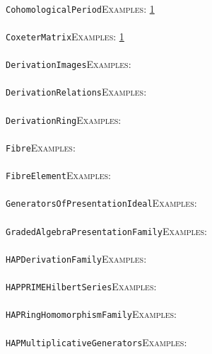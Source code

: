 \documentclass[a4paper,11pt]{report}
\begin{document}
{{ \\
 \texttt{CohomologicalPeriod}{\nobreakspace}{\nobreakspace}{\nobreakspace}{\nobreakspace}\textsc{Examples:} \href{tutorial/chap10.html} {1}{\nobreakspace} \\
 \\
 \texttt{CoxeterMatrix}{\nobreakspace}{\nobreakspace}{\nobreakspace}{\nobreakspace}\textsc{Examples:} \href{../www/SideLinks/About/aboutDavisComplex.html} {1}{\nobreakspace} \\
 \\
 \texttt{DerivationImages}{\nobreakspace}{\nobreakspace}{\nobreakspace}{\nobreakspace}\textsc{Examples:} \\
 \\
 \texttt{DerivationRelations}{\nobreakspace}{\nobreakspace}{\nobreakspace}{\nobreakspace}\textsc{Examples:} \\
 \\
 \texttt{DerivationRing}{\nobreakspace}{\nobreakspace}{\nobreakspace}{\nobreakspace}\textsc{Examples:} \\
 \\
 \texttt{Fibre}{\nobreakspace}{\nobreakspace}{\nobreakspace}{\nobreakspace}\textsc{Examples:} \\
 \\
 \texttt{FibreElement}{\nobreakspace}{\nobreakspace}{\nobreakspace}{\nobreakspace}\textsc{Examples:} \\
 \\
 \texttt{GeneratorsOfPresentationIdeal}{\nobreakspace}{\nobreakspace}{\nobreakspace}{\nobreakspace}\textsc{Examples:} \\
 \\
 \texttt{GradedAlgebraPresentationFamily}{\nobreakspace}{\nobreakspace}{\nobreakspace}{\nobreakspace}\textsc{Examples:} \\
 \\
 \texttt{HAPDerivationFamily}{\nobreakspace}{\nobreakspace}{\nobreakspace}{\nobreakspace}\textsc{Examples:} \\
 \\
 \texttt{HAPPRIME{\textunderscore}HilbertSeries}{\nobreakspace}{\nobreakspace}{\nobreakspace}{\nobreakspace}\textsc{Examples:} \\
 \\
 \texttt{HAPRingHomomorphismFamily}{\nobreakspace}{\nobreakspace}{\nobreakspace}{\nobreakspace}\textsc{Examples:} \\
 \\
 \texttt{HAP{\textunderscore}MultiplicativeGenerators}{\nobreakspace}{\nobreakspace}{\nobreakspace}{\nobreakspace}\textsc{Examples:} \\
}}
\end{document}

